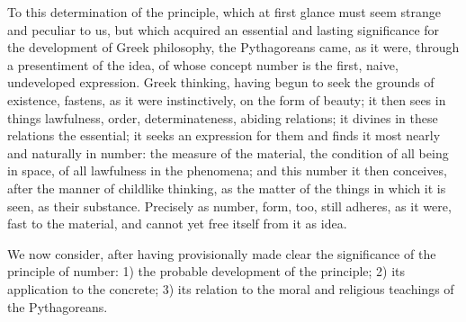 To this determination of the principle, which at first glance must
seem strange and peculiar to us, but which acquired an essential and
lasting significance for the development of Greek philosophy,
\setcounter{footnote}{0}the Pythagoreans came, as it were,
through a presentiment of the idea, of whose concept number is the
first, naive, undeveloped expression. Greek thinking, having begun to
seek the grounds of existence, fastens, as it were instinctively, on
the form of beauty; it then sees in things lawfulness, order,
determinateness, abiding relations; it divines in these relations the
essential; it seeks an expression for them and finds it most nearly and
naturally in number: the measure of the material, the condition of all
being in space, of all lawfulness in the phenomena; and this number it
then conceives, after the manner of childlike thinking, as the matter
of the things in which it is seen, as their substance. Precisely as
number, form, too, still adheres, as it were, fast to the material, and
cannot yet free itself from it as idea.

We now consider, after having provisionally made clear the significance
of the principle of number: 1) the probable development of the
principle; 2) its application to the concrete; 3) its relation to the
moral and religious teachings of the Pythagoreans.

